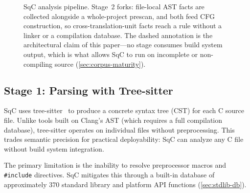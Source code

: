 \begin{figure}[t]
{}
\caption{SqC analysis pipeline.  Stage~2 forks: file-local AST facts
are collected alongside a whole-project prescan, and both feed CFG
construction, so cross-translation-unit facts reach a rule without a
linker or a compilation database.  The dashed annotation is the
architectural claim of this paper---no stage consumes build
system output, which is what allows SqC to run on incomplete or
non-compiling source (\cref{sec:corpus-maturity}).}
\label{fig:pipeline}
\end{figure}

\subsection{Stage 1: Parsing with Tree-sitter}

SqC uses tree-sitter~\cite{tree-sitter} to produce a concrete syntax
tree (CST) for each C source file.  Unlike tools built on Clang's AST
(which requires a full compilation database), tree-sitter operates on
individual files without preprocessing.  This trades semantic precision
for practical deployability: SqC can analyze any C file without build
system integration.

The primary limitation is the inability to resolve preprocessor macros
and \texttt{\#include} directives.  SqC mitigates this through a
built-in database of approximately 370 standard library and platform
API functions (\cref{sec:stdlib-db}).

